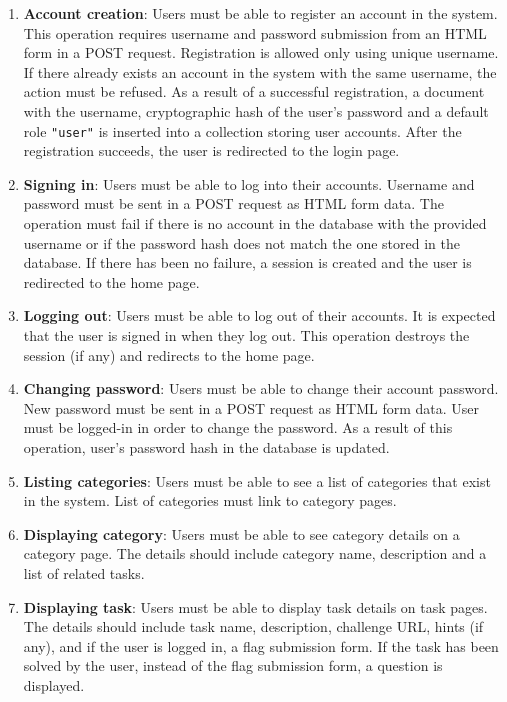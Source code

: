 \begin{enumerate}
	\item \textbf{Account creation}: Users must be able to register an account in the system.
	This operation requires username and password submission from an HTML form in a POST request.
	Registration is allowed only using unique username. If there already exists an account in the system with the same username, the action must be refused.
	As a result of a successful registration, a document with the username, cryptographic hash of the user's password and a default role \texttt{"user"} is inserted into a collection storing user accounts. After the registration succeeds, the user is redirected to the login page.

	\item \textbf{Signing in}: Users must be able to log into their accounts.
	Username and password must be sent in a POST request as HTML form data. The operation must fail if there is no account in the database with the provided username or if the password hash does not match the one stored in the database.
	If there has been no failure, a session is created and the user is redirected to the home page.

	\item \textbf{Logging out}: Users must be able to log out of their accounts.
	It is expected that the user is signed in when they log out. This operation destroys the session (if any) and redirects to the home page.

	\item \textbf{Changing password}: Users must be able to change their account password.
	New password must be sent in a POST request as HTML form data. User must be logged-in in order to change the password.
	As a result of this operation, user's password hash in the database is updated.

	\item \textbf{Listing categories}: Users must be able to see a list of categories that exist in the system. List of categories must link to category pages.

	\item \textbf{Displaying category}: Users must be able to see category details on a category page. The details should include category name, description and a list of related tasks.

	\item \textbf{Displaying task}: Users must be able to display task details on task pages. The details should include task name, description, challenge URL, hints (if any), and if the user is logged in, a flag submission form. If the task has been solved by the user, instead of the flag submission form, a question is displayed.


\end{enumerate}
